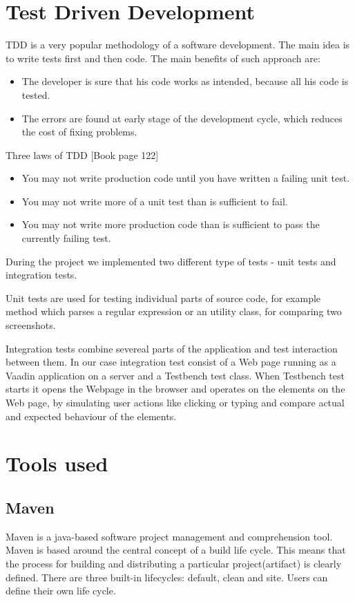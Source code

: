   \section{Test Driven Development}
  TDD is a very popular methodology of a software development. The main idea is
  to write tests first and then code. The main benefits of such approach are:
      \begin{itemize}
        \item The developer is sure that his code works as intended, because all
        his code is tested.
        \item The errors are found at early stage of the development cycle, which
        reduces the cost of fixing problems.
      \end{itemize}
      
      Three laws of TDD \cite[pp122]{cleancode}[Book page 122]
        \begin{itemize}
          \item You may not write production code until you have written a failing unit test.
          \item You may not write more of a unit test than is sufficient to fail.
          \item You may not write more production code than is sufficient to pass the currently failing test.
        \end{itemize}
    
  During the project we implemented two different type of tests - unit tests and
  integration tests. 
  
  Unit tests are used for testing individual parts of source
  code, for example method which parses a regular expression or an utility
  class, for comparing two screenshots.
  
  Integration tests combine severeal parts of the application and test 
  interaction between them. In our case integration test consist of a Web page
  running as a Vaadin application on a server and a Testbench test class. When
  Testbench test starts it opens the Webpage in the browser and operates on the
  elements on the Web page, by simulating user actions like clicking or typing
  and compare actual and expected behaviour of the elements. 
      
  \section {Tools used}
  \label{sec:toolsused}
  
  \subsection{Maven}
  Maven is a java-based software project management and comprehension tool.
  Maven is based around the central concept of a build life cycle. This means
  that the process for building and distributing a particular project(artifact) is clearly defined. There are three built-in lifecycles:
  default, clean and site. Users can define their own life cycle. 
  
